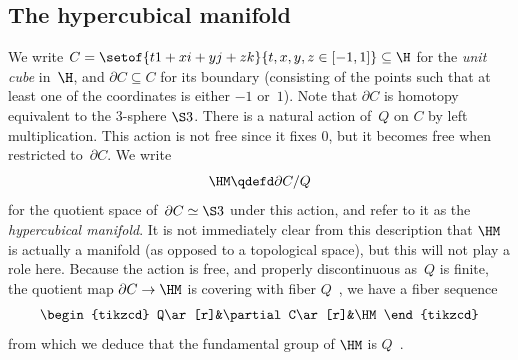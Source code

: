 \documentclass[a4paper]{article}
\begin{document}
\subsection{The hypercubical manifold}
\label{hypercubical-manifold}
We write $C=\setof{t1+xi+yj+zk}{t,x,y,z\in[-1,1]}\subseteq\H$ for the \emph{unit cube} in $\H$, and $\partial C\subseteq C$ for its boundary (consisting of the points such that at least one of the coordinates is either $-1$ or $1$). Note that $\partial C$ is homotopy equivalent to the 3-sphere $\S3$. There is a natural action of~$Q$ on $C$ by left multiplication. This action is not free since it fixes $0$, but it becomes free when restricted to~$\partial C$.
We write
\[
  \HM\qdefd\partial C/Q
\]
for the quotient space of~$\partial C\simeq\S3$ under this action, and refer to it as the \emph{hypercubical manifold}.
%
It is not immediately clear from this description that $\HM$ is actually a manifold (as opposed to a topological space), but this will not play a role here.
%
Because the action is free, and properly discontinuous as~$Q$ is finite, the quotient map $\partial C\to\HM$ is covering with fiber $Q$~\cite[Proposition 1.40]{hatcher}, \ie we have a fiber sequence
\[
  \begin{tikzcd}
    Q\ar[r]&\partial C\ar[r]&\HM
  \end{tikzcd}
\]
from which we deduce that the fundamental group of $\HM$ is $Q$~\cite[Theorem 4.41]{hatcher}.

\label{hm-fundamental-group}
\end{document}
